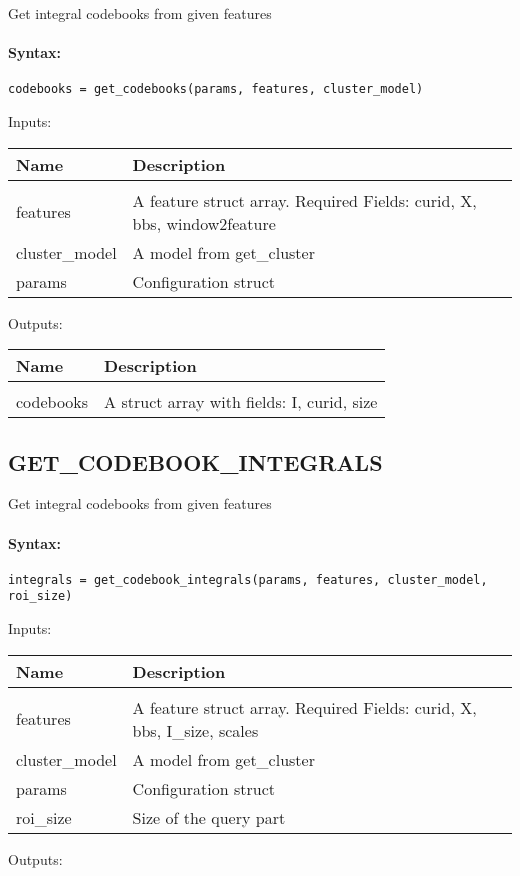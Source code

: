 Get integral codebooks from given features

\paragraph{Syntax:} \verb|codebooks = get_codebooks(params, features, cluster_model)|

Inputs:

\begin{tabular}{|l|p{5cm}|}
\hline
\textbf{Name} & \textbf{Description} \\
\hline \hline \\
features & A feature struct array. Required Fields: curid, X, bbs, window2feature  \\ \hline
cluster\_model & A model from get\_cluster  \\ \hline
params & Configuration struct  \\ \hline
\end{tabular}
Outputs:

\begin{tabular}{|l|p{5cm}|}
\hline
\textbf{Name} & \textbf{Description} \\
\hline \hline \\
codebooks & A struct array with fields: I, curid, size  \\ \hline
\end{tabular}

\subsection{GET\_CODEBOOK\_INTEGRALS}

Get integral codebooks from given features

\paragraph{Syntax:} \verb|integrals = get_codebook_integrals(params, features, cluster_model, roi_size)|

Inputs:

\begin{tabular}{|l|p{5cm}|}
\hline
\textbf{Name} & \textbf{Description} \\
\hline \hline \\
features & A feature struct array. Required Fields: curid, X, bbs, I\_size, scales  \\ \hline
cluster\_model & A model from get\_cluster  \\ \hline
params & Configuration struct  \\ \hline
roi\_size & Size of the query part  \\ \hline
\end{tabular}
Outputs:

